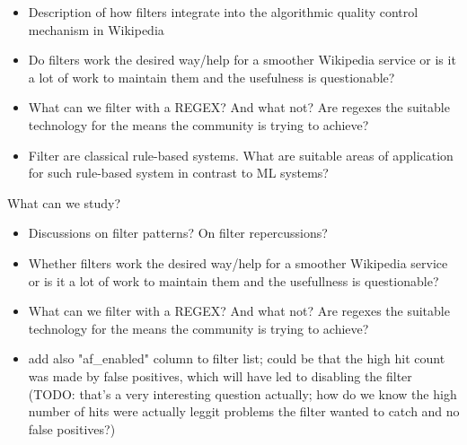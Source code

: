 \begin{itemize}
    \item Description of how filters integrate into the algorithmic quality control mechanism in Wikipedia
    \item Do filters work the desired way/help for a smoother Wikipedia service or is it a lot of work to maintain them and the usefulness is questionable?
    \item What can we filter with a REGEX? And what not? Are regexes the suitable technology for the means the community is trying to achieve?
    \item Filter are classical rule-based systems. What are suitable areas of application for such rule-based system in contrast to ML systems?
\end{itemize}


What can we study?

\begin{itemize}
    \item Discussions on filter patterns? On filter repercussions?
    \item Whether filters work the desired way/help for a smoother Wikipedia service or is it a lot of work to maintain them and the usefullness is questionable?
    \item What can we filter with a REGEX? And what not? Are regexes the suitable technology for the means the community is trying to achieve?
    \item add also "af\_enabled" column to filter list; could be that the high hit count was made by false positives, which will have led to disabling the filter (TODO: that's a very interesting question actually; how do we know the high number of hits were actually leggit problems the filter wanted to catch and no false positives?)
\end{itemize}


